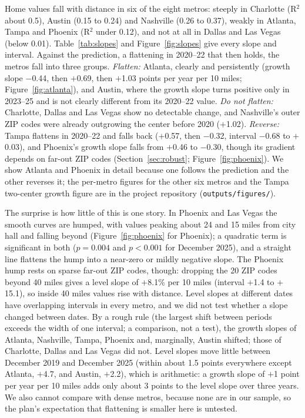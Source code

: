 \documentclass[11pt]{article}
\begin{document}
Home values fall with distance in six of the eight metros: steeply in Charlotte (R$^2$ about 0.5), Austin (0.15 to 0.24) and
Nashville (0.26 to 0.37), weakly in Atlanta, Tampa and Phoenix (R$^2$ under 0.12), and not at all in Dallas and Las Vegas (below
0.01). Table~\ref{tab:slopes} and Figure~\ref{fig:slopes} give every slope and interval. Against the prediction, a flattening in
2020--22 that then holds, the metros fall into three groups. \emph{Flatten:} Atlanta, clearly and persistently (growth slope
$-$0.44, then $+$0.69, then $+$1.03 points per year per 10 miles; Figure~\ref{fig:atlanta}), and Austin, where the growth slope
turns positive only in 2023--25 and is not clearly different from its 2020--22 value. \emph{Do not flatten:} Charlotte, Dallas and
Las Vegas show no detectable change, and Nashville's outer ZIP codes were already outgrowing the center before 2020
($+$1.02). \emph{Reverse:} Tampa flattens in 2020--22 and falls back ($+$0.57, then $-$0.32, interval $-$0.68 to $+$0.03), and
Phoenix's growth slope falls from $+$0.46 to $-$0.30, though its gradient depends on far-out ZIP codes
(Section~\ref{sec:robust}; Figure~\ref{fig:phoenix}). We show Atlanta and Phoenix in detail because one follows the prediction and
the other reverses it; the per-metro figures for the other six metros and the Tampa two-center growth figure are in the project
repository (\texttt{outputs/figures/}).

The surprise is how little of this is one story. In Phoenix and Las Vegas the smooth curves are humped, with values peaking about
24 and 15 miles from city hall and falling beyond (Figure~\ref{fig:phoenix} for Phoenix); a quadratic term is significant in both
($p=0.004$ and $p<0.001$ for December 2025), and a straight line flattens the hump into a near-zero or mildly negative slope.
The Phoenix hump rests on sparse far-out ZIP codes, though: dropping the 20 ZIP codes beyond 40 miles gives a level slope of
$+$8.1\% per 10 miles (interval $+$1.4 to $+$15.1), so inside 40 miles values rise with distance. Level slopes at different dates
have overlapping intervals in every metro, and we did not test whether a slope changed between dates. By a rough rule (the
largest shift between periods exceeds the width of one interval; a comparison, not a test), the growth slopes of Atlanta,
Nashville, Tampa, Phoenix and, marginally, Austin shifted; those of Charlotte, Dallas and Las Vegas did not. Level slopes move
little between December 2019 and December 2025 (within about 1.5 points everywhere except Atlanta, $+$4.7, and Austin,
$+$2.2), which is arithmetic: a growth slope of $+$1 point per year per 10 miles adds only about 3 points to the level slope
over three years. We also cannot compare with dense metros, because none are in our sample, so the plan's expectation that
flattening is smaller here is untested.
\end{document}
